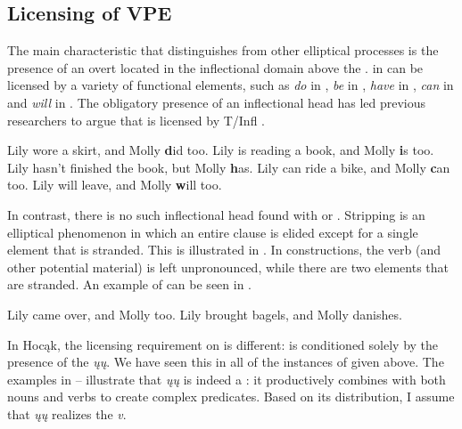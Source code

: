\documentclass[output=paper]{LSP/langsci}
\begin{document}
\subsection{Licensing of VPE}\label{sec:johnson:2.2}

The main characteristic that distinguishes  from other elliptical processes is the presence of an overt  located in the inflectional domain above the .  in  can be licensed by a variety of functional elements, such as \emph{do} in , \emph{be} in , \emph{have} in , \emph{can} in  and \emph{will} in . The obligatory presence of an inflectional head has led previous researchers to argue that  is licensed by T/Infl \citep{Bresnan1976,Sag1976,Zagona1988,Lobeck1995}.

 
\ea\label{ex:johnson:12}
\ea\label{ex:johnson:12a}
Lily wore a skirt, and Molly {\textbf did} too.
\ex\label{ex:johnson:12b}
Lily is reading a book, and Molly {\textbf is} too.
\ex\label{ex:johnson:12c}
Lily hasn't finished the book, but Molly {\textbf has}.
\ex\label{ex:johnson:12d}
Lily can ride a bike, and Molly {\textbf can} too.
\ex\label{ex:johnson:12e} 
Lily will leave, and Molly {\textbf will} too.
\z
\z

In contrast, there is no such inflectional head found with  or . Stripping is an elliptical phenomenon in which an entire clause is elided except for a single element that is stranded. This is illustrated in . In  constructions, the verb (and other potential material) is left unpronounced, while there are two elements that are stranded. An example of  can be seen in .
 
\ea\label{ex:johnson:13}
\ea\label{ex:johnson:13a}
Lily came over, and Molly too.
\ex\label{ex:johnson:13b} 
Lily brought bagels, and Molly danishes.
\z
\z

In Hocąk, the licensing requirement on  is different:  is conditioned solely by the presence of the  \emph{ųų}. We have seen this in all of the instances of  given above. The examples in -- illustrate that \emph{ųų} is indeed a : it productively combines with both nouns and verbs to create complex predicates. Based on its distribution, I assume that \emph{ųų} realizes the  \emph{v}. \citep[Examples 14--18]{Hartmann2012}
 
\end{document}
